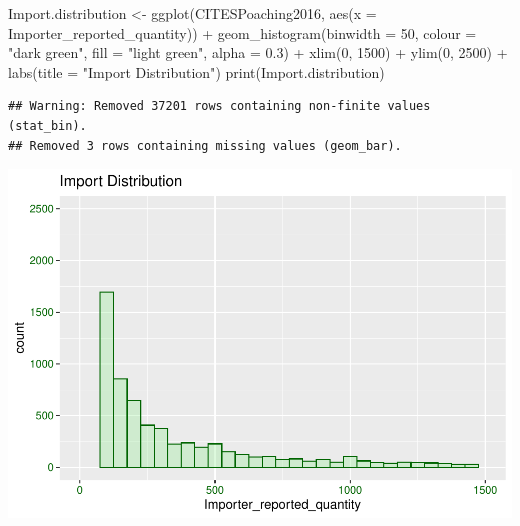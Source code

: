 \documentclass[
  12pt,
]{article}
\newenvironment{Shaded}{\begin{snugshade}}{\end{snugshade}}
\newcommand{\AttributeTok}[1]{\textcolor[rgb]{0.77,0.63,0.00}{#1}}
\newcommand{\DecValTok}[1]{\textcolor[rgb]{0.00,0.00,0.81}{#1}}
\newcommand{\FloatTok}[1]{\textcolor[rgb]{0.00,0.00,0.81}{#1}}
\newcommand{\FunctionTok}[1]{\textcolor[rgb]{0.00,0.00,0.00}{#1}}
\newcommand{\NormalTok}[1]{#1}
\newcommand{\OtherTok}[1]{\textcolor[rgb]{0.56,0.35,0.01}{#1}}
\newcommand{\SpecialCharTok}[1]{\textcolor[rgb]{0.00,0.00,0.00}{#1}}
\newcommand{\StringTok}[1]{\textcolor[rgb]{0.31,0.60,0.02}{#1}}
\begin{document}
\begin{Shaded}
\begin{Highlighting}[]
\NormalTok{Import.distribution }\OtherTok{\textless{}{-}} \FunctionTok{ggplot}\NormalTok{(CITESPoaching2016, }\FunctionTok{aes}\NormalTok{(}\AttributeTok{x =}\NormalTok{ Importer\_reported\_quantity)) }\SpecialCharTok{+}
    \FunctionTok{geom\_histogram}\NormalTok{(}\AttributeTok{binwidth =} \DecValTok{50}\NormalTok{, }\AttributeTok{colour =} \StringTok{"dark green"}\NormalTok{, }\AttributeTok{fill =} \StringTok{"light green"}\NormalTok{, }\AttributeTok{alpha =} \FloatTok{0.3}\NormalTok{) }\SpecialCharTok{+}
    \FunctionTok{xlim}\NormalTok{(}\DecValTok{0}\NormalTok{, }\DecValTok{1500}\NormalTok{) }\SpecialCharTok{+} \FunctionTok{ylim}\NormalTok{(}\DecValTok{0}\NormalTok{, }\DecValTok{2500}\NormalTok{) }\SpecialCharTok{+} \FunctionTok{labs}\NormalTok{(}\AttributeTok{title =} \StringTok{"Import Distribution"}\NormalTok{)}
\FunctionTok{print}\NormalTok{(Import.distribution)}
\end{Highlighting}
\end{Shaded}

\begin{verbatim}
## Warning: Removed 37201 rows containing non-finite values (stat_bin).
## Removed 3 rows containing missing values (geom_bar).
\end{verbatim}

\includegraphics{Wood_ENV872_Project_files/figure-latex/unnamed-chunk-4-2.pdf}
\end{document}
